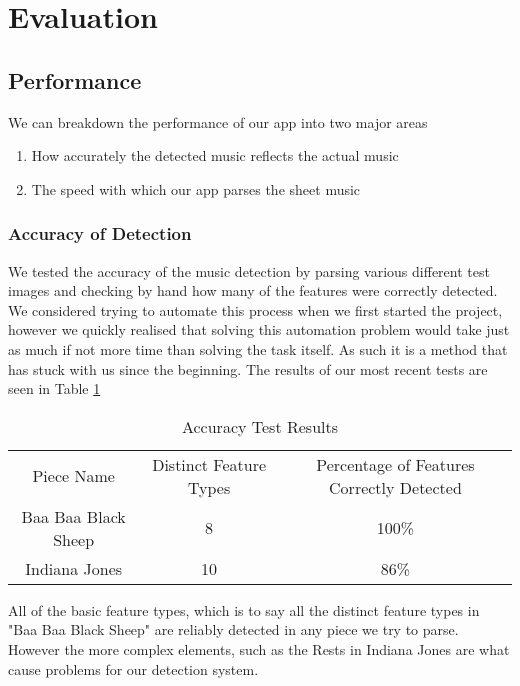 \section{Evaluation}
    
    \subsection{Performance}
    We can breakdown the performance of our app into two major areas
        \begin{enumerate}
        \item{How accurately the detected music reflects the actual music}
        \item{The speed with which our app parses the sheet music}
        \end{enumerate}
        \subsubsection{Accuracy of Detection}
            We tested the accuracy of the music detection by parsing various different test images and checking by hand how many of the features were correctly detected. We considered trying to automate this process when we first started the project, however we quickly realised that solving this automation problem would take just as much if not more time than solving the task itself. As such it is a method that has stuck with us since the beginning.
            The results of our most recent tests are seen in Table \ref{table:acctestresults}
            \begin{table}[h!]
                \centering
                \begin{tabular}{ c | c | c }
                    Piece Name & Distinct Feature Types & Percentage of Features Correctly Detected \\
                    Baa Baa Black Sheep & 8 & 100\% \\
                    Indiana Jones & 10 & 86\%\\
                \end{tabular}
                \caption{Accuracy Test Results}
                \label{table:acctestresults}
            \end{table}
            
            All of the basic feature types, which is to say all the distinct feature types in "Baa Baa Black Sheep" are reliably detected in any piece we try to parse. However the more complex elements, such as the Rests in Indiana Jones are what cause problems for our detection system.

